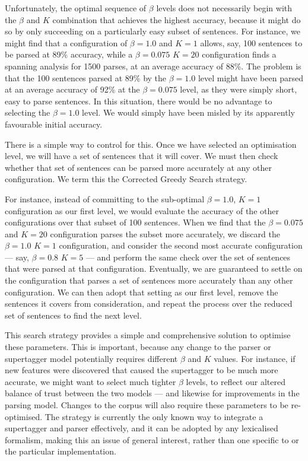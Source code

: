Unfortunately, the optimal sequence of $\beta$ levels does not necessarily begin
with the $\beta$ and $K$ combination that achieves the highest accuracy, because
it might do so by only succeeding on a particularly easy subset of sentences.
For instance, we might find that a configuration of $\beta=1.0$ and $K=1$
allows, say, 100 sentences to be parsed at 89\% accuracy, while a $\beta=0.075$
$K=20$ configuration finds a spanning analysis for 1500 parses, at an average
accuracy of 88\%. The problem is that the 100 sentences parsed at 89\% by the
$\beta=1.0$ level might have been parsed at an average accuracy of 92\% at the
$\beta=0.075$ level, as they were simply short, easy to parse sentences. In this
situation, there would be no advantage to selecting the $\beta=1.0$ level. We
would simply have been misled by its apparently favourable initial accuracy.

There is a simple way to control for this. Once we have selected an optimisation
level, we will have a set of sentences that it will cover. We must then check
whether that set of sentences can be parsed more accurately at any other
configuration. We term this the Corrected Greedy Search strategy.

For instance, instead of committing to the sub-optimal $\beta=1.0$, $K=1$
configuration as our first level, we would evaluate the accuracy of the other
configurations over that subset of 100 sentences. When we find that the
$\beta=0.075$ and $K=20$ configuration parses the subset more accurately, we
discard the $\beta=1.0$ $K=1$ configuration, and consider the second most
accurate configuration --- say, $\beta=0.8$ $K=5$ --- and perform the same check
over the set of sentences that were parsed at that configuration. Eventually, we
are guaranteed to settle on the configuration that parses a set of sentences
more accurately than any other configuration. We can then adopt that setting as
our first level, remove the sentences it covers from consideration, and repeat
the process over the reduced set of sentences to find the next level.

This search strategy provides a simple and comprehensive solution to optimise
these parameters. This is important, because any change to the parser or
supertagger model potentially requires different $\beta$ and $K$ values. For
instance, if new features were discovered that caused the supertagger to be much
more accurate, we might want to select much tighter $\beta$ levels, to reflect
our altered balance of trust between the two models --- and likewise for
improvements in the parsing model. Changes to the corpus will also require these
parameters to be re-optimised. The \candc strategy is currently the only known
way to integrate a supertagger and parser effectively, and it can be adopted by
any lexicalised formalism, making this an issue of general interest, rather than
one specific to \ccg or the particular \candc implementation.


